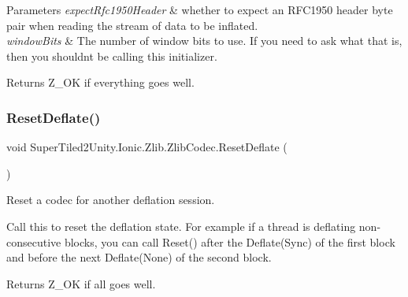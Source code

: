 \begin{DoxyParams}{Parameters}
{\em expect\+Rfc1950\+Header} & whether to expect an R\+F\+C1950 header byte pair when reading the stream of data to be inflated.\\
\hline
{\em window\+Bits} & The number of window bits to use. If you need to ask what that is, then you shouldn\textquotesingle{}t be calling this initializer.\\
\hline
\end{DoxyParams}
\begin{DoxyReturn}{Returns}
Z\+\_\+\+OK if everything goes well.
\end{DoxyReturn}
\mbox{\label{class_super_tiled2_unity_1_1_ionic_1_1_zlib_1_1_zlib_codec_a75cf8e1228a42f1646f4697059e24d8a}} 
\subsubsection{\texorpdfstring{Reset\+Deflate()}{ResetDeflate()}}
{\footnotesize\ttfamily void Super\+Tiled2\+Unity.\+Ionic.\+Zlib.\+Zlib\+Codec.\+Reset\+Deflate (\begin{DoxyParamCaption}{ }\end{DoxyParamCaption})}



Reset a codec for another deflation session. 

Call this to reset the deflation state. For example if a thread is deflating non-\/consecutive blocks, you can call Reset() after the Deflate(\+Sync) of the first block and before the next Deflate(\+None) of the second block. 

\begin{DoxyReturn}{Returns}
Z\+\_\+\+OK if all goes well.
\end{DoxyReturn}
\mbox{\label{class_super_tiled2_unity_1_1_ionic_1_1_zlib_1_1_zlib_codec_afa2870874eea3783d45f87599760dffa}} 
